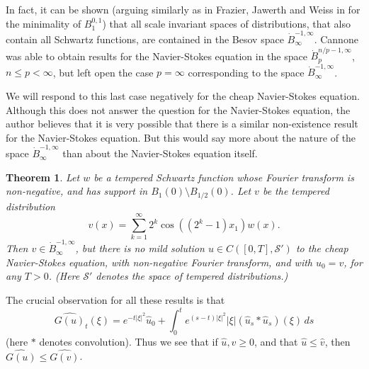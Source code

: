 \documentclass[12pt]{amsart}
\newtheorem{thm}{Theorem}
\newcommand{\modo}[1]{{\left|#1\right|}}
\begin{document}
In fact, it can be shown (arguing similarly as in Frazier, Jawerth and Weiss 
in \cite{FJW} for the minimality of $B^{0,1}_1$)
that all scale invariant spaces of distributions,
that also contain all Schwartz functions, are
contained in the Besov space $\dot B^{-1,\infty}_\infty$.
Cannone \cite{Ca1} was able to obtain results for the Navier-Stokes
equation in the space $\dot B^{n/p-1,\infty}_p$, 
$n\leq p<\infty$, but left open the case $p=\infty$ corresponding
to the space $\dot B^{-1,\infty}_\infty$.

We will respond to this last case negatively for
the cheap Navier-Stokes equation.  Although this does not answer
the question for the Navier-Stokes equation, the author believes that
it is very possible that there is a similar non-existence result
for the Navier-Stokes equation.  But this would say more about the
nature of the space $\dot B^{-1,\infty}_\infty$ than about the 
Navier-Stokes equation itself.

\begin{thm}
\label{no-exist}
Let $w$ be a tempered Schwartz function whose Fourier transform
is non-negative, and has support in 
$B_{1}(0) \setminus B_{1/2}(0)$.
Let $v$ be the tempered distribution
\[ 
v(x) = \sum_{k=1}^\infty 2^k \cos((2^k-1) x_1) w(x) .
\]
Then $v \in \dot B^{-1,\infty}_\infty$, but there is
no mild solution $u\in C([0,T],{\mathcal S}')$ to the cheap 
Navier-Stokes equation, with non-negative
Fourier transform, and with $u_0=v$, for any $T>0$. (Here
${\mathcal S}'$ denotes the space of tempered distributions.)
\end{thm}

\noindent
The crucial observation for all these results is that
\begin{equation*}
\widehat{G(u)}_t(\xi) = 
e^{-t\modo{\xi}^2} \hat u_0 
+ \int_0^t e^{(s-t)\modo{\xi}^2} \modo{\xi} (\hat u_s*\hat u_s)(\xi) \, ds
\end{equation*}
(here $*$ denotes convolution).  Thus we see that if $\hat u, \hat v \ge 0$,
and that $\hat u \le \hat v$, then $\widehat{G(u)} \le \widehat{G(v)}$.
\end{document}
